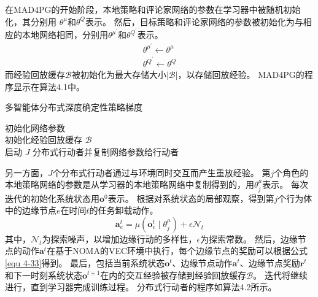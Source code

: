 在MAD4PG的开始阶段，本地策略和评论家网络的参数在学习器中被随机初始化，其分别用 $\theta^{\mu}$和$\theta^{Q}$表示。
然后，目标策略和评论家网络的参数被初始化为与相应的本地网络相同，分别用$\theta^{\mu^{\prime}}$和$\theta^{Q^{\prime}}$表示。
\begin{align}
	\theta^{\mu^{\prime}} \leftarrow \theta^{\mu}\\
	\theta^{Q^{\prime}} \leftarrow \theta^{Q}
\end{align}
而经验回放缓存$\mathcal{B}$被初始化为最大存储大小$|\mathcal{B}|$，以存储回放经验。
MAD4PG的程序显示在算法4.1中。


\begin{algorithm}[h]\small
\renewcommand{\algorithmcfname}{算法}
	\caption{多智能体分布式深度确定性策略梯度}
	初始化网络参数\\
	初始化经验回放缓存 $\mathcal{B}$\\
	启动 $J$ 分布式行动者并复制网络参数给行动者\\
\label{algorithm 4-1}
\end{algorithm}

另一方面，$J$个分布式行动者通过与环境同时交互而产生重放经验。
第$j$个角色的本地策略网络的参数是从学习器的本地策略网络中复制得到的，用$\theta^{\mu}_{j}$表示。
每次迭代的初始化系统状态用$\boldsymbol{o}^{0}$表示。
根据对系统状态的局部观察，得到第$j$个行为体中的边缘节点$e$在时间$t$的任务卸载动作。
\begin{equation}
	\boldsymbol{a}_{e}^{t}={\mu}\left(\boldsymbol{o}_{e}^{t} \mid \theta^{\mu}_{j}\right)+\epsilon  \mathcal{N}_{t}
\end{equation}
\noindent 其中，$\mathcal{N}_{t}$为探索噪声，以增加边缘行动的多样性，$\epsilon$为探索常数。
然后，边缘节点的动作$\boldsymbol{a}^{t}$在基于NOMA的VEC环境中执行，每个边缘节点的奖励可以根据公式\ref{equ 4-33}得到。
最后，包括当前系统状态$\boldsymbol{o}^{t}$、边缘节点动作$\boldsymbol{a}^{t}$、边缘节点奖励$\boldsymbol{r}^{t}$和下一时刻系统状态$\boldsymbol{o}^{t+1}$在内的交互经验被存储到经验回放缓存$\mathcal{B}$。
迭代将继续进行，直到学习器完成训练过程。
分布式行动者的程序如算法4.2所示。

